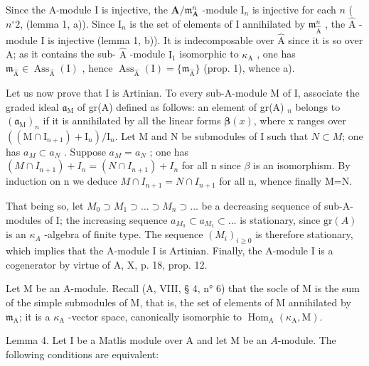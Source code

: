 Since the A-module I is injective, the \(\mathbf{A} / \mathfrak{m}_{\mathbf{A}}^{n}\) -module \(\mathrm{I}_n\) is injective for each \(n\) ( \(n^{\circ}2\), (lemma 1, a)). Since \(\mathrm{I}_n\) is the set of elements of I annihilated by \(\mathfrak{m}_{\widehat{\mathrm{A}}}^{n}\) , the \(\widehat{\mathrm{A}}\) -module I is injective (lemma 1, b)). It is indecomposable over \(\widehat{\mathrm{A}}\) since it is so over \(\mathrm{A}\); as it contains the sub- \(\widehat{\mathrm{A}}\) -module \(\mathrm{I}_1\) isomorphic to \(\kappa_{\mathrm{A}}\) , one has \(\mathfrak{m}_{\widehat{\mathrm{A}}} \in \operatorname{Ass}_{\widehat{\mathrm{A}}}(\mathrm{I})\) , hence \(\operatorname{Ass}_{\widehat{\mathrm{A}}}(\mathrm{I}) = \{\mathfrak{m}_{\widehat{\mathrm{A}}}\}\) (prop. 1), whence a).

Let us now prove that I is Artinian. To every sub-A-module M of I, associate the graded ideal \(\mathfrak{a}_{\mathrm{M}}\) of gr(A) defined as follows: an element of gr(A) \(_n\) belongs to \((\mathfrak{a}_{\mathrm{M}})_{n}\) if it is annihilated by all the linear forms \(\boldsymbol{\beta}(x)\), where x ranges over \(\left((\mathrm{M}\cap\mathrm{I}_{n+1})+\mathrm{I}_{n}\right)/\mathrm{I}_{n}\). Let M and N be submodules of I such that \(N\subset M\); one has \(a_{M}\subset a_{N}\) . Suppose \(a_{M}=a_{N}\) ; one has \((M\cap I_{n+1})+I_{n}=(N\cap I_{n+1})+I_{n}\) for all n since \(\beta\) is an isomorphism. By induction on n we deduce \(M\cap I_{n+1}=N\cap I_{n+1}\) for all n, whence finally M=N.

That being so, let \(M_{0} \supset M_{1} \supset \ldots \supset M_{n} \supset \ldots\) be a decreasing sequence of sub-A-modules of I; the increasing sequence \(a_{M_{0}} \subset a_{M_{1}} \subset \ldots\) is stationary, since \(\text{gr}(A)\) is an \(\kappa_{A}\) -algebra of finite type. The sequence \((M_{i})_{i \geqslant 0}\) is therefore stationary, which implies that the A-module I is Artinian. Finally, the A-module I is a cogenerator by virtue of A, X, p. 18, prop. 12.

Let M be an A-module. Recall (A, VIII, § 4, n° 6) that the socle of M is the sum of the simple submodules of M, that is, the set of elements of M annihilated by \(\mathfrak{m}_{\mathrm{A}}\); it is a \(\kappa_{\mathrm{A}}\) -vector space, canonically isomorphic to \(\operatorname{Hom}_{\mathrm{A}}(\kappa_{\mathrm{A}}, \mathrm{M})\).

Lemma 4. Let I be a Matlis module over A and let M be an \(A\)-module. The following conditions are equivalent:

